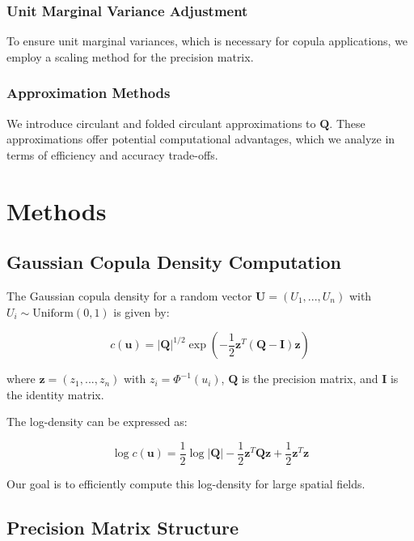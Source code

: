 \documentclass[journal=,manuscript=]{achemso}
\begin{document}
\subsubsection{Unit Marginal Variance
Adjustment}\label{unit-marginal-variance-adjustment}

To ensure unit marginal variances, which is necessary for copula
applications, we employ a scaling method for the precision matrix.

\subsubsection{Approximation Methods}\label{approximation-methods}

We introduce circulant and folded circulant approximations to
\(\mathbf{Q}\). These approximations offer potential computational
advantages, which we analyze in terms of efficiency and accuracy
trade-offs.

\section{Methods}\label{methods}

\subsection{Gaussian Copula Density
Computation}\label{gaussian-copula-density-computation}

The Gaussian copula density for a random vector
\(\mathbf{U} = (U_1, ..., U_n)\) with \(U_i \sim \text{Uniform}(0,1)\)
is given by:

\[
c(\mathbf{u}) = |\mathbf{Q}|^{1/2} \exp\left(-\frac{1}{2}\mathbf{z}^T(\mathbf{Q} - \mathbf{I})\mathbf{z}\right)
\]

where \(\mathbf{z} = (z_1, ..., z_n)\) with \(z_i = \Phi^{-1}(u_i)\),
\(\mathbf{Q}\) is the precision matrix, and \(\mathbf{I}\) is the
identity matrix.

The log-density can be expressed as:

\[
\log c(\mathbf{u}) = \frac{1}{2}\log|\mathbf{Q}| - \frac{1}{2}\mathbf{z}^T\mathbf{Q}\mathbf{z} + \frac{1}{2}\mathbf{z}^T\mathbf{z}
\]

Our goal is to efficiently compute this log-density for large spatial
fields.

\subsection{Precision Matrix
Structure}\label{precision-matrix-structure-1}
\end{document}
